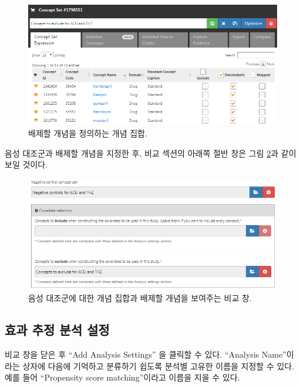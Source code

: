 \documentclass[10.5pt]{book}
\theoremstyle{definition}
\theoremstyle{definition}
\theoremstyle{definition}
\theoremstyle{remark}
\begin{document}
\begin{figure}

{\centering \includegraphics[width=1\linewidth]{images/PopulationLevelEstimation/covsToExclude} 

}

\caption{배제할 개념을 정의하는 개념 집합.}\label{fig:covsToExclude}
\end{figure}

음성 대조군과 배제할 개념을 지정한 후, 비교 섹션의 아래쪽 절반 창은 그림
\ref{fig:comparisons2}과 같이 보일 것이다.

\begin{figure}

{\centering \includegraphics[width=1\linewidth]{images/PopulationLevelEstimation/comparisons2} 

}

\caption{음성 대조군에 대한 개념 집합과 배제할 개념을 보여주는 비교 창.}\label{fig:comparisons2}
\end{figure}

\subsection{효과 추정 분석 설정}\label{---}

비교 창을 닫은 후 ``Add Analysis Settings'' 을 클릭할 수 있다.
``Analysis Name''이라는 상자에 다음에 기억하고 분류하기 쉽도록 분석별
고유한 이름을 지정할 수 있다. 예를 들어 ``Propensity score
matching''이라고 이름을 지을 수 있다.
\end{document}
